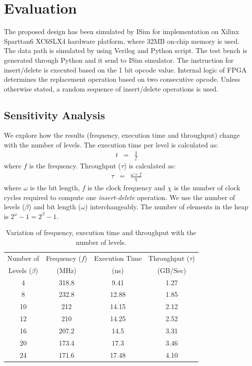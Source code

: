 \section{Evaluation}

The proposed design has been simulated by ISim for implementation on Xilinx Sparttan6 XC6SLX4 hardware platform, where 32MB on-chip memory is used. 
The data path is simulated by using Verilog and Python script. 
The test bench is generated through Python and it send to ISim simulator. 
The instruction for insert/delete is executed based on the 1 bit opcode value. 
Internal logic of FPGA determines the replacement operation based on two consecutive opcode. 
Unless otherwise stated, a random sequence of insert/delete operations is used.

\subsection{Sensitivity Analysis}

We explore how the results (frequency, execution time and throughput) change with the number of levels.
The execution time per level is calculated as:
\begin{eqnarray}
t &=&  \frac{3}{f}
\end{eqnarray}
where $f$ is the frequency. 
Throughput ($\tau$) is calculated as:
\begin{eqnarray}
\tau &=&  \frac{\omega \times  f}{\chi}
\end{eqnarray}
 where $\omega$ is the bit length, $f$ is the clock frequency and $\chi$ is the number of clock cycles required to compute one {\it insert-delete} operation.
We use the number of levels ($\beta$) and bit length ($\omega$) interchangeably. 
The number of elements in the heap is $2^\omega-1 = 2^\beta -1$. 

 \begin{table}
 \begin{center}
 \caption{Variation of frequency, execution time and throughput with the number of levels.}
\label{table1}
\begin{tabular}{ |c|c|c|c| }
 \hline
 Number of & Frequency ($f$) & Execution Time& Throughput ($\tau$) \\
 Levels ($\beta$) & (MHz)& (ns)& (GB/Sec)\\
 \hline
 \hline
 4 & 318.8 & 9.41 & 1.27\\
 8 & 232.8 & 12.88 & 1.85\\
 10 & 212 & 14.15 & 2.12 \\
 12 & 210 & 14.25 & 2.52 \\
 16 & 207.2 & 14.5 & 3.31\\
 20 & 173.4 & 17.3 & 3.46 \\
 24 & 171.6 & 17.48 & 4.10\\
 \hline
\end{tabular}
\end{center}
\end{table}

